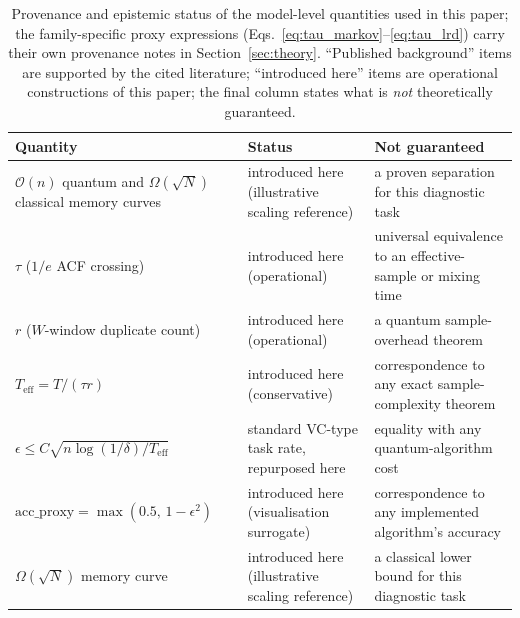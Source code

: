 \documentclass[sensors,article,submit,pdftex,moreauthors]{Definitions/mdpi}
\newcommand{\bigO}{\mathcal{O}}
\newcommand{\Teff}{T_{\mathrm{eff}}}
\providecommand{\DIFadd}[1]{{\protect\color{blue}#1}} %
\providecommand{\DIFdel}[1]{} %
\providecommand{\DIFaddbegin}{} %
\providecommand{\DIFdelbegin}{} %
\providecommand{\DIFdelend}{} %
\providecommand{\DIFaddFL}[1]{\DIFadd{#1}} %
\begin{document}
\DIFdelbegin \DIFdel{The heuristic classification accuracy proxy used in our experiments is: }\begin{displaymath}
\DIFdel{\mathrm{acc\_proxy} = \max\!\left(0.5,\; 1 - \epsilon^2\right),
\label{eq:acc_proxy}
}\end{displaymath}%
\DIFdel{where the floor of $0.5$ represents the random-guess baseline for binary classification. When $\epsilon^2 > 0.5$ (as occurs in the long-memory regime), the proxy saturates at $0.5$, reflecting that the model predicts no useful signal. This is an engineering surrogate that translates oracle approximation quality into a classification metric for visualization}\DIFdelend \DIFaddbegin \begin{table}[t]
\centering
\caption{\DIFaddFL{Provenance and epistemic status of the model-level quantities used in this paper; the family-specific proxy expressions (Eqs.~\eqref{eq:tau_markov}--\eqref{eq:tau_lrd}) carry their own provenance notes in Section~\ref{sec:theory}. ``Published background'' items are supported by the cited literature; ``introduced here'' items are operational constructions of this paper; the final column states what is }\emph{\DIFaddFL{not}} \DIFaddFL{theoretically guaranteed.}}
\label{tab:provenance}
\begin{tabularx}{\textwidth}{@{}p{5.1cm}p{3.6cm}X@{}}
\toprule
Quantity & Status & Not guaranteed \\
\midrule
$\bigO(n)$ quantum and $\Omega(\sqrt{N})$ classical memory curves & introduced here (illustrative scaling reference) & a proven separation for this diagnostic task \\
$\tau$ ($1/e$ ACF crossing) & introduced here (operational) & universal equivalence to an effective-sample or mixing time \\
$r$ ($W$-window duplicate count) & introduced here (operational) & a quantum sample-overhead theorem \\
$\Teff = T/(\tau r)$ & introduced here (conservative) & correspondence to any exact sample-complexity theorem \\
$\epsilon \leq C\sqrt{n \log(1/\delta)/\Teff}$ & standard VC-type task rate, repurposed here & equality with any quantum-algorithm cost \\
$\mathrm{acc\_proxy} = \max(0.5,\, 1 - \epsilon^2)$ & introduced here (visualisation surrogate) & correspondence to any implemented algorithm's accuracy \\
$\Omega(\sqrt{N})$ memory curve & introduced here (illustrative scaling reference) & a classical lower bound for this diagnostic task \\
\bottomrule
\end{tabularx}
\end{table}
\end{document}
